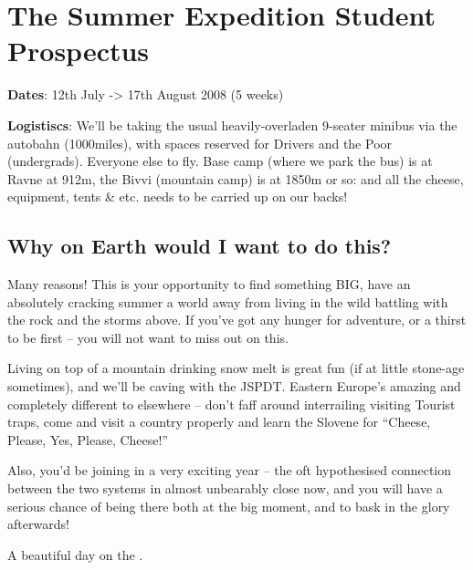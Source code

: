 \section{The Summer Expedition Student Prospectus}

\textbf{Dates}: 12th July -> 17th August 2008 (5 weeks)


\textbf{Logistiscs}: We'll be taking the usual heavily-overladen 9-seater
minibus via the autobahn (1000miles), with spaces reserved for
Drivers and the Poor (undergrads). Everyone else to fly.
Base camp (where we park the bus) is at Ravne at 912m, the
Bivvi (mountain camp) is at 1850m or so: and all the cheese,
equipment, tents \& etc. needs to be carried up on our backs!

\subsection{Why on Earth would I want to do this?}

Many reasons! This is your opportunity to find something BIG, have an absolutely cracking summer a world away from  living in the wild battling with the rock and the storms above. If you've got any hunger for adventure, or a thirst to be first – you will not want to miss out on this.

Living on top of a mountain drinking snow melt is great fun (if at little stone-age sometimes), and we'll be
caving with the JSPDT. Eastern Europe's amazing and completely different to elsewhere – don't faff around
interrailing visiting Tourist traps, come and visit a country properly and learn the Slovene for “Cheese, Please, Yes, Please, Cheese!”

Also, you'd be joining in a very exciting year – the oft hypothesised connection between the two systems in almost unbearably close now, and you will have a serious chance of being there both at the big moment, and to bask in the glory afterwards!

\begin{pagefigure}
\checkoddpage \ifoddpage \forcerectofloat \else \forceversofloat \fi
\centering
{}
\caption{A beautiful day on the . } \label{tents}
\end{pagefigure}